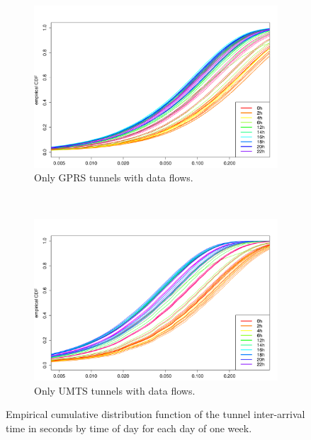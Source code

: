 \begin{figure}
        \begin{subfigure}[b]{0.50\textwidth}
                \centering
                \includegraphics[width=\textwidth]{images/IMC2013/R-IAT-fromflows-gprs-ecdfs-2h.png}
                \caption{Only GPRS tunnels with data flows.}
                \label{fig:IAT-ecdf-2h-active-gprs}
        \end{subfigure}%
        ~
        \begin{subfigure}[b]{0.50\textwidth}
                \centering
                \includegraphics[width=\textwidth]{images/IMC2013/R-IAT-fromflows-umts-ecdfs-2h.png}
                \caption{Only UMTS tunnels with data flows.}
                \label{fig:IAT-ecdf-2h-active-umts}
        \end{subfigure}
        \caption{Empirical cumulative distribution function of the tunnel inter-arrival time in seconds by time of day for each day of one week.}\label{fig:IAT-ecdf-2h}
\end{figure}

